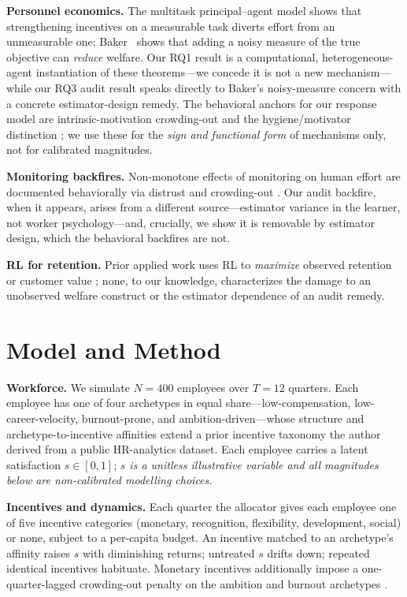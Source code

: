 \documentclass[11pt]{article}
\begin{document}
\textbf{Personnel economics.} The multitask principal--agent model
\citep{holmstrom1991} shows that strengthening incentives on a measurable task
diverts effort from an unmeasurable one; Baker~\citep{baker1992} shows that adding a
noisy measure of the true objective can \emph{reduce} welfare. Our RQ1 result is
a computational, heterogeneous-agent instantiation of these theorems---we
concede it is not a new mechanism---while our RQ3 audit result speaks directly to
Baker's noisy-measure concern with a concrete estimator-design remedy. The
behavioral anchors for our response model are intrinsic-motivation crowding-out
\citep{deci1999,frey2001} and the hygiene/motivator distinction
\citep{herzberg1959}; we use these for the \emph{sign and functional form} of
mechanisms only, not for calibrated magnitudes.

\textbf{Monitoring backfires.} Non-monotone effects of monitoring on human
effort are documented behaviorally via distrust and crowding-out
\citep{falk2006,dickinson2008}. Our audit backfire, when it appears, arises from
a different source---estimator variance in the learner, not worker
psychology---and, crucially, we show it is removable by estimator design, which
the behavioral backfires are not.

\textbf{RL for retention.} Prior applied work uses RL to \emph{maximize}
observed retention or customer value \citep{cheng2020}; none, to our knowledge,
characterizes the damage to an unobserved welfare construct or the estimator
dependence of an audit remedy.

\section{Model and Method}\label{sec:method}
\textbf{Workforce.} We simulate $N{=}400$ employees over $T{=}12$ quarters. Each
employee has one of four archetypes in equal share---low-compensation,
low-career-velocity, burnout-prone, and ambition-driven---whose structure and
archetype-to-incentive affinities extend a prior incentive taxonomy the author
derived from a public HR-analytics dataset. Each employee carries a latent
satisfaction $s\in[0,1]$; \emph{$s$ is a unitless illustrative variable and all
magnitudes below are non-calibrated modelling choices.}

\textbf{Incentives and dynamics.} Each quarter the allocator gives each employee
one of five incentive categories (monetary, recognition, flexibility,
development, social) or none, subject to a per-capita budget. An incentive
matched to an archetype's affinity raises $s$ with diminishing returns;
untreated $s$ drifts down; repeated identical incentives habituate. Monetary
incentives additionally impose a one-quarter-lagged crowding-out penalty on the
ambition and burnout archetypes \citep{deci1999,frey2001}.
\end{document}
